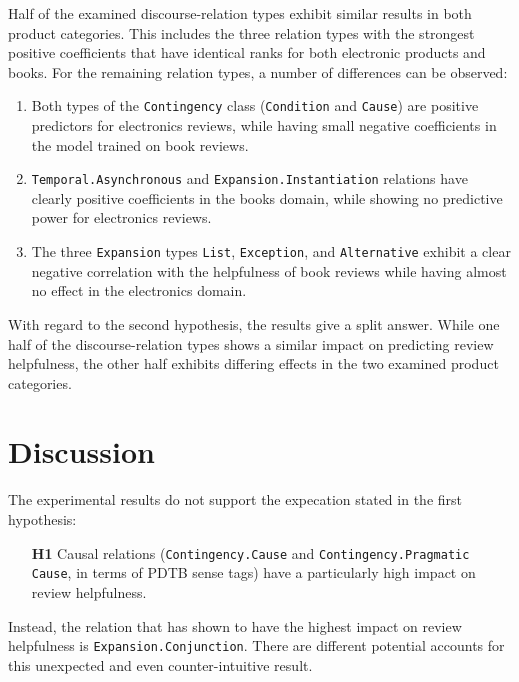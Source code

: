 \documentclass[
    a4paper,%
    12pt,%
    oneside,%
    toc=bibliography,
    final,
]{scrartcl}
\begin{document}
Half of the examined discourse-relation types exhibit similar results in both product categories. This includes the three relation types with the strongest positive coefficients that have identical ranks for both electronic products and books. For the remaining relation types, a number of differences can be observed: 

\begin{enumerate}
\item Both types of the \lstinline|Contingency| class (\lstinline|Condition| and \lstinline|Cause|) are positive predictors for electronics reviews, while having small negative coefficients in the model trained on book reviews.
\item \lstinline|Temporal.Asynchronous| and \lstinline|Expansion.Instantiation| relations have clearly positive coefficients in the books domain, while showing no predictive power for electronics reviews.
\item The three \lstinline|Expansion| types \lstinline|List|, \lstinline|Exception|, and \lstinline|Alternative| exhibit a clear negative correlation with the helpfulness of book reviews while having almost no effect in the electronics domain.
\end{enumerate}

With regard to the second hypothesis, the results give a split answer. While one half of the discourse-relation types shows a similar impact on predicting review helpfulness, the other half exhibits differing effects in the two examined product categories.

\section{Discussion}
\label{sec:discussion}

The experimental results do not support the expecation stated in the first hypothesis:

\begin{enumerate}[rightmargin=1cm]
\item[\textbf{H1}] Causal relations (\lstinline|Contingency.Cause| and \lstinline|Contingency.Pragmatic Cause|, in terms of PDTB sense tags) have a particularly high impact on review helpfulness.
\end{enumerate}

\begin{sloppypar}
Instead, the relation that has shown to have the highest impact on review helpfulness is \lstinline|Expansion.Conjunction|. There are different potential accounts for this unexpected and even counter-intuitive result.
\end{sloppypar}
\end{document}
